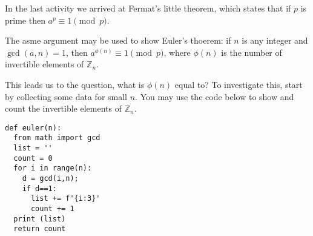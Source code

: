 \documentclass[12pt]{exam}
\newcommand{\Z}{\mathbb Z}
\begin{document}
\begin{questions}
  \question In the last activity we arrived at Fermat's little theorem, which states that if $p$ is prime then $a^p\equiv1\pmod{p}$.
  
  The asme argument may be used to show Euler's thoerem: if $n$ is any integer and $\gcd(a,n)=1$, then $a^{\phi(n)}\equiv1\pmod{p}$, where $\phi(n)$ is the number of invertible elements of $\Z_n$.
  
  This leads us to the question, what is $\phi(n)$ equal to? To investigate this, start by collecting some data for small $n$. You may use the code below to show and count the invertible elements of $\Z_n$.
  
  \begin{lstlisting}
def euler(n):
  from math import gcd
  list = ''
  count = 0
  for i in range(n):
    d = gcd(i,n);
    if d==1:
      list += f'{i:3}'
      count += 1
  print (list)
  return count
  \end{lstlisting}
  

\end{questions}
\end{document}
